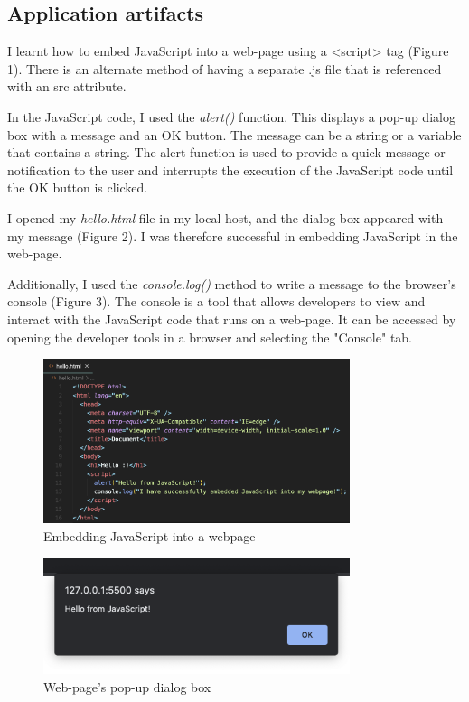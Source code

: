 \documentclass[a4paper, 11pt]{report}
\begin{document}
\subsection{Application artifacts}
I learnt how to embed JavaScript into a web-page using a <script> tag (Figure 1). There is an alternate method of having a separate .js file that is referenced with an src attribute.

In the JavaScript code, I used the \emph{alert()} function. This displays a pop-up dialog box with a message and an OK button. The message can be a string or a variable that contains a string. The alert function is used to provide a quick message or notification to the user and interrupts the execution of the JavaScript code until the OK button is clicked.

I opened my \emph{hello.html} file in my local host, and the dialog box appeared with my message (Figure 2). I was therefore successful in embedding JavaScript in the web-page. 

Additionally, I used the \emph{console.log()} method to write a message to the browser's console (Figure 3). The console is a tool that allows developers to view and interact with the JavaScript code that runs on a web-page. It can be accessed by opening the developer tools in a browser and selecting the "Console" tab.

\begin{figure}[ht]
    \centering
    \includegraphics[width=0.8\textwidth]{Images/embedding1.png}
    \caption{Embedding JavaScript into a webpage}
    \label{fig:screenshot}
\end{figure}

\begin{figure}[ht]
    \centering
    \includegraphics[width=0.8\textwidth]{Images/embedding2.png}
    \caption{Web-page's pop-up dialog box}
    \label{fig:screenshot}
\end{figure}
\end{document}
